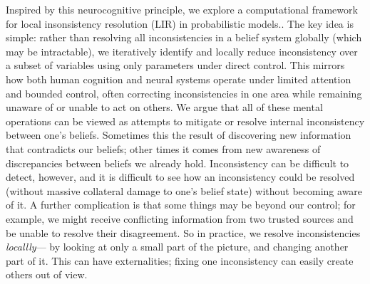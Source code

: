 \documentclass{article} %
\theoremstyle{plain}
\theoremstyle{definition}
\theoremstyle{remark}
\begin{document}
Inspired by this  neurocognitive principle, we explore a computational framework for local insonsistency resolution (LIR) in probabilistic models.. The key idea is simple: rather than resolving all inconsistencies in a belief system globally (which may be intractable), we iteratively identify and locally reduce inconsistency over a subset of variables using only parameters under direct control. This mirrors how both human cognition and neural systems operate under limited attention and bounded control, often correcting inconsistencies in one area while remaining unaware of or unable to act on others.
We argue that all of these mental operations can be viewed as 
attempts to mitigate or resolve internal inconsistency between one's beliefs. Sometimes this the result of discovering new information that contradicts our beliefs;
other times it comes from new awareness of discrepancies between beliefs we already hold.
%
Inconsistency can be difficult to detect, however, and 
   it is difficult to see how an inconsistency 
       could be resolved (without massive collateral damage to one's belief state)
       without becoming aware of it.
A further complication is that some things may be beyond our control;
   for example, we might receive conflicting information
       from two trusted sources and be unable to  resolve
       their disagreement.
So in practice, we resolve inconsistencies \emph{locallly}---%
   by looking at only a small part of the picture,
   and changing another part of it.
This can have externalities; fixing one inconsistency can easily create others out of view.
\end{document}
